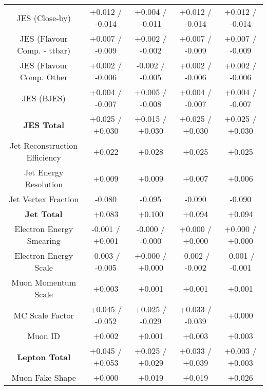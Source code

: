\begin{table}[htbp]
\begin{center}
\begin{tabular}{|c|c|c|c|c|}
JES (Close-by)                        &+0.012   / -0.014   & +0.004   / -0.011   & +0.012   / -0.014   & +0.012   / -0.014  \\
JES (Flavour Comp. - ttbar)           &+0.007   / -0.009   & +0.002   / -0.002   & +0.007   / -0.009   & +0.007   / -0.009  \\
JES (Flavour Comp. Other              &+0.002   / -0.006   & -0.002   / -0.005   & +0.002   / -0.006   & +0.002   / -0.006  \\
JES (BJES)                            &+0.004   / -0.007   & +0.005   / -0.008   & +0.004   / -0.007   & +0.004   / -0.007  \\
\hline
\textbf{JES Total}                    &+0.025   / +0.030   & +0.015   / +0.030   & +0.025   / +0.030   & +0.025   / +0.030  \\
\hline
Jet Reconstruction Efficiency         &+0.022              & +0.028              & +0.025              & +0.025             \\
Jet Energy Resolution                 &+0.009              & +0.009              & +0.007              & +0.006             \\
Jet Vertex Fraction                   &-0.080              & -0.095              & -0.090              & -0.090             \\
\hline
\textbf{Jet Total}                    &+0.083              & +0.100              & +0.094              & +0.094             \\
\hline
Electron Energy Smearing              &-0.001   / +0.001   & -0.000   / -0.000   & +0.000   / +0.000   & +0.000   / +0.000  \\
Electron Energy Scale                 &-0.003   / -0.005   & +0.000   / +0.000   & -0.002   / -0.002   & -0.001   / -0.001  \\
Muon Momentum Scale                   &+0.003              & +0.001              & +0.001              & +0.001             \\
MC Scale Factor                       &+0.045   / -0.052   & +0.025   / -0.029   & +0.033   / -0.039   & +0.000             \\
Muon ID                               &+0.002              & +0.001              & +0.003              & +0.003             \\
\hline
\textbf{Lepton Total}                 &+0.045   / +0.053   & +0.025   / +0.029   & +0.033   / +0.039   & +0.003   / +0.003  \\
\hline
Muon Fake Shape                       &+0.000              & +0.019              & +0.019              & +0.026             \\

\end{tabular}
\end{center}
\end{table}
